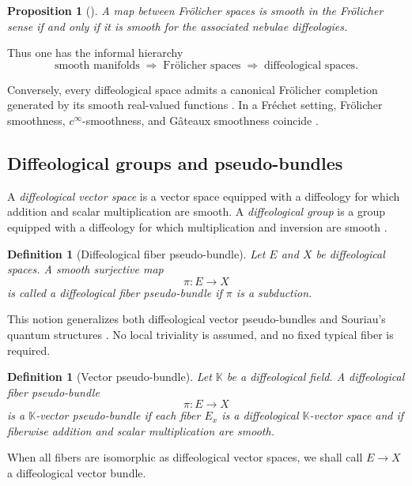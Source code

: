 \documentclass[11pt]{amsart}
\newtheorem{proposition}[theorem]{Proposition}
\newtheorem{definition}[theorem]{Definition}
\begin{document}
\begin{proposition}[\cite{Ma2006-3}]
A map between Frölicher spaces is smooth in the Frölicher sense if and only if it is smooth for the associated nebulae diffeologies.
\end{proposition}

Thus one has the informal hierarchy
\[
\text{smooth manifolds}
\;\Longrightarrow\;
\text{Frölicher spaces}
\;\Longrightarrow\;
\text{diffeological spaces}.
\]

Conversely, every diffeological space admits a canonical Frölicher completion generated by its smooth real-valued functions \cite{Watts2012Thesis,BIgKWa2014}. In a Fréchet setting, Frölicher smoothness, \(c^\infty\)-smoothness, and Gâteaux smoothness coincide \cite[Theorem 4.11]{KM}.

\subsection{Diffeological groups and pseudo-bundles}

A \emph{diffeological vector space} is a vector space equipped with a diffeology for which addition and scalar multiplication are smooth. A \emph{diffeological group} is a group equipped with a diffeology for which multiplication and inversion are smooth \cite{IglesiasZemmour2013,Pervova2016}.

\begin{definition}[Diffeological fiber pseudo-bundle]
Let \(E\) and \(X\) be diffeological spaces. A smooth surjective map
\[
\pi:E\to X
\]
is called a \emph{diffeological fiber pseudo-bundle} if \(\pi\) is a subduction.
\end{definition}

This notion generalizes both diffeological vector pseudo-bundles \cite{Pervova2016} and Souriau's quantum structures \cite{Sou}. No local triviality is assumed, and no fixed typical fiber is required.

\begin{definition}[Vector pseudo-bundle]
Let \(\mathbb K\) be a diffeological field. A diffeological fiber pseudo-bundle
\[
\pi:E\to X
\]
is a \(\mathbb K\)-vector pseudo-bundle if each fiber \(E_x\) is a diffeological \(\mathbb K\)-vector space and if fiberwise addition and scalar multiplication are smooth.
\end{definition}

When all fibers are isomorphic as diffeological vector spaces, we shall call \(E\to X\) a diffeological vector bundle.
\end{document}
